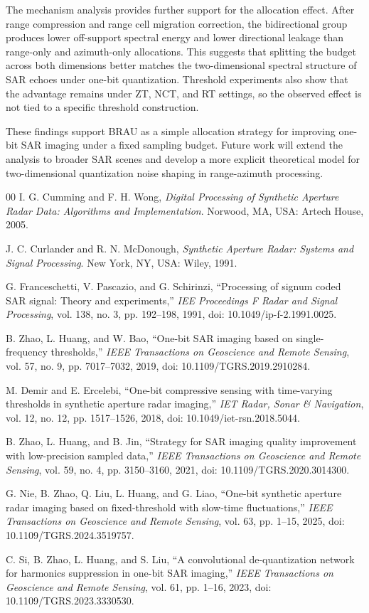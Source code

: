 \documentclass[conference]{IEEEtran}
\begin{document}
The mechanism analysis provides further support for the allocation effect. After range compression and range cell migration correction, the bidirectional group produces lower off-support spectral energy and lower directional leakage than range-only and azimuth-only allocations. This suggests that splitting the budget across both dimensions better matches the two-dimensional spectral structure of SAR echoes under one-bit quantization. Threshold experiments also show that the advantage remains under ZT, NCT, and RT settings, so the observed effect is not tied to a specific threshold construction.

These findings support BRAU as a simple allocation strategy for improving one-bit SAR imaging under a fixed sampling budget. Future work will extend the analysis to broader SAR scenes and develop a more explicit theoretical model for two-dimensional quantization noise shaping in range-azimuth processing.

\begin{thebibliography}{00}
I. G. Cumming and F. H. Wong, \textit{Digital Processing of Synthetic Aperture Radar Data: Algorithms and Implementation}. Norwood, MA, USA: Artech House, 2005.

J. C. Curlander and R. N. McDonough, \textit{Synthetic Aperture Radar: Systems and Signal Processing}. New York, NY, USA: Wiley, 1991.

G. Franceschetti, V. Pascazio, and G. Schirinzi, ``Processing of signum coded SAR signal: Theory and experiments,'' \textit{IEE Proceedings F Radar and Signal Processing}, vol. 138, no. 3, pp. 192--198, 1991, doi: 10.1049/ip-f-2.1991.0025.

B. Zhao, L. Huang, and W. Bao, ``One-bit SAR imaging based on single-frequency thresholds,'' \textit{IEEE Transactions on Geoscience and Remote Sensing}, vol. 57, no. 9, pp. 7017--7032, 2019, doi: 10.1109/TGRS.2019.2910284.

M. Demir and E. Ercelebi, ``One-bit compressive sensing with time-varying thresholds in synthetic aperture radar imaging,'' \textit{IET Radar, Sonar \& Navigation}, vol. 12, no. 12, pp. 1517--1526, 2018, doi: 10.1049/iet-rsn.2018.5044.

B. Zhao, L. Huang, and B. Jin, ``Strategy for SAR imaging quality improvement with low-precision sampled data,'' \textit{IEEE Transactions on Geoscience and Remote Sensing}, vol. 59, no. 4, pp. 3150--3160, 2021, doi: 10.1109/TGRS.2020.3014300.

G. Nie, B. Zhao, Q. Liu, L. Huang, and G. Liao, ``One-bit synthetic aperture radar imaging based on fixed-threshold with slow-time fluctuations,'' \textit{IEEE Transactions on Geoscience and Remote Sensing}, vol. 63, pp. 1--15, 2025, doi: 10.1109/TGRS.2024.3519757.

C. Si, B. Zhao, L. Huang, and S. Liu, ``A convolutional de-quantization network for harmonics suppression in one-bit SAR imaging,'' \textit{IEEE Transactions on Geoscience and Remote Sensing}, vol. 61, pp. 1--16, 2023, doi: 10.1109/TGRS.2023.3330530.
\end{thebibliography}
\end{document}
